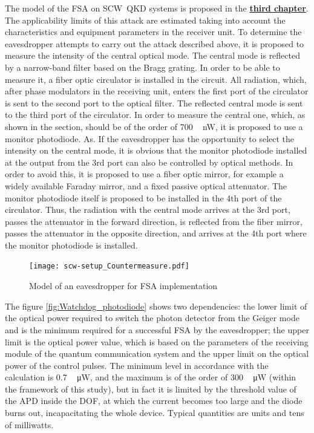 The model of the FSA on SCW~QKD systems is proposed in the \underline{\textbf{third chapter}}. The applicability limits of this attack are estimated taking into account the characteristics and equipment parameters in the receiver unit. To determine the eavesdropper attempts to carry out the attack described above, it is proposed to measure the intensity of the central optical mode. The central mode is reflected by a narrow-band filter based on the Bragg grating. In order to be able to measure it, a fiber optic circulator is installed in the circuit. All radiation, which, after phase modulators in the receiving unit, enters the first port of the circulator is sent to the second port to the optical filter. The reflected central mode is sent to the third port of the circulator. In order to measure the central one, which, as shown in the section, should be of the order of 700 ~ nW, it is proposed to use a monitor photodiode. As. If the eavesdropper has the opportunity to select the intensity on the central mode, it is obvious that the monitor photodiode installed at the output from the 3rd port can also be controlled by optical methods. In order to avoid this, it is proposed to use a fiber optic mirror, for example a widely available Faraday mirror, and a fixed passive optical attenuator. The monitor photodiode itself is proposed to be installed in the 4th port of the circulator. Thus, the radiation with the central mode arrives at the 3rd port, passes the attenuator in the forward direction, is reflected from the fiber mirror, passes the attenuator in the opposite direction, and arrives at the 4th port where the monitor photodiode is installed.       
 \begin{figure}[ht]
  \centering
  \texttt{[image: scw-setup\_Countermeasure.pdf]}
  \caption{Model of an eavesdropper for FSA implementation}
  \label{fig:countermeasure}
\end{figure}


The figure \ref{fig:Watchdog_photodiode} shows two dependencies: the lower limit of the optical power required to switch the photon detector from the Geiger mode and is the minimum required for a successful FSA by the eavesdropper; the upper limit is the optical power value, which is based on the parameters of the receiving module of the quantum communication system and the upper limit on the optical power of the control pulses. The minimum level in accordance with the calculation is 0.7 ~ μW, and the maximum is of the order of 300 ~ μW (within the framework of this study), but in fact it is limited by the threshold value of the APD inside the DOF, at which the current becomes too large and the diode burns out, incapacitating the whole device. Typical quantities are units and tens of milliwatts.
 
